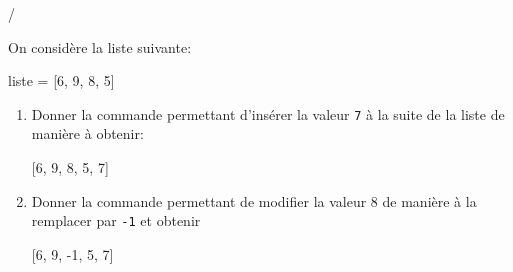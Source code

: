 \documentclass[a4paper]{article}
\begin{document}
\medskip
\begin{exerciceinterro}{\hspace{2cm}\dotfill/}{}

On considère la liste suivante:

\begin{CodePythontexAlt}[Largeur=17cm,
TaillePolice = \normalsize, 
EspacementVertical = 1.2,
Lignes=false]{}
liste = [6, 9, 8, 5]
\end{CodePythontexAlt}


\begin{enumerate}

\item Donner la commande permettant d'insérer la valeur \verb+7+ à la suite de la liste de manière à obtenir:

\begin{CodePythontexAlt}[Largeur=17cm,
TaillePolice = \normalsize, 
EspacementVertical = 1.2,
Lignes=false]{}
[6, 9, 8, 5, 7]
\end{CodePythontexAlt}

	\zonereponse{1cm}

\item Donner la commande permettant de modifier la valeur 8 de manière à la remplacer par \verb+-1+ et obtenir 

\begin{CodePythontexAlt}[Largeur=17cm,
TaillePolice = \normalsize, 
EspacementVertical = 1.2,
Lignes=false]{}
[6, 9, -1, 5, 7]
\end{CodePythontexAlt}

	\zonereponse{1cm}


\end{enumerate}
\end{exerciceinterro}

\medskip
\end{document}
